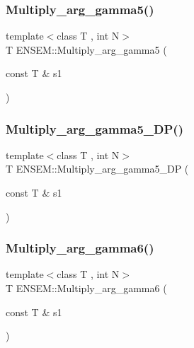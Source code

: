 \mbox{\label{namespaceENSEM_a8e465294989989eb52731a497103b658}} 
\subsubsection{\texorpdfstring{Multiply\_arg\_gamma5()}{Multiply\_arg\_gamma5()}}
{\footnotesize\ttfamily template$<$class T , int N$>$ \\
T E\+N\+S\+E\+M\+::\+Multiply\+\_\+arg\+\_\+gamma5 (\begin{DoxyParamCaption}\item[{const T \&}]{s1 }\end{DoxyParamCaption})\hspace{0.3cm}{\ttfamily [inline]}}

\mbox{\label{namespaceENSEM_a4fa6e39200a0df1fd7fa5731efe9641e}} 
\subsubsection{\texorpdfstring{Multiply\_arg\_gamma5\_DP()}{Multiply\_arg\_gamma5\_DP()}}
{\footnotesize\ttfamily template$<$class T , int N$>$ \\
T E\+N\+S\+E\+M\+::\+Multiply\+\_\+arg\+\_\+gamma5\+\_\+\+DP (\begin{DoxyParamCaption}\item[{const T \&}]{s1 }\end{DoxyParamCaption})\hspace{0.3cm}{\ttfamily [inline]}}

\mbox{\label{namespaceENSEM_a4ddbb1d4cde2c8657237efcf3b668f48}} 
\subsubsection{\texorpdfstring{Multiply\_arg\_gamma6()}{Multiply\_arg\_gamma6()}}
{\footnotesize\ttfamily template$<$class T , int N$>$ \\
T E\+N\+S\+E\+M\+::\+Multiply\+\_\+arg\+\_\+gamma6 (\begin{DoxyParamCaption}\item[{const T \&}]{s1 }\end{DoxyParamCaption})\hspace{0.3cm}{\ttfamily [inline]}}

